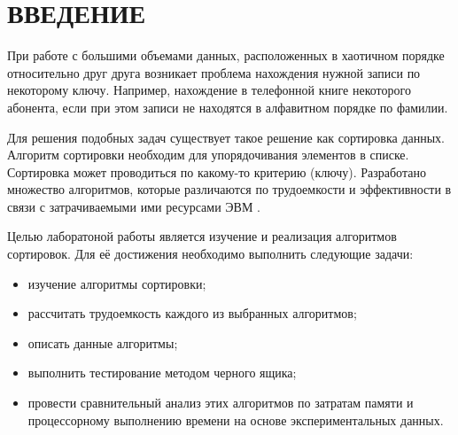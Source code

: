 \part*{ВВЕДЕНИЕ}
При работе с большими объемами данных, расположенных в хаотичном порядке относительно друг друга возникает проблема нахождения нужной записи по некоторому ключу. Например, нахождение в телефонной книге некоторого абонента, если при этом записи не находятся в алфавитном порядке по фамилии.

Для решения подобных задач существует такое решение как сортировка данных. Алгоритм сортировки необходим для упорядочивания элементов в списке. Сортировка может проводиться по какому-то критерию (ключу). Разработано множество алгоритмов, которые различаются по трудоемкости и эффективности в связи с затрачиваемыми ими ресурсами ЭВМ \cite{compare}.

Целью лаборатоной работы является изучение и реализация алгоритмов сортировок. Для её достижения необходимо выполнить следующие задачи:
\begin{itemize}
	\item изучение алгоритмы сортировки;
	\item рассчитать трудоемкость каждого из выбранных алгоритмов;
	\item описать данные алгоритмы;
	\item выполнить тестирование методом черного ящика;
	\item провести сравнительный анализ этих алгоритмов по затратам памяти и процессорному выполнению времени на основе экспериментальных данных.
\end{itemize}